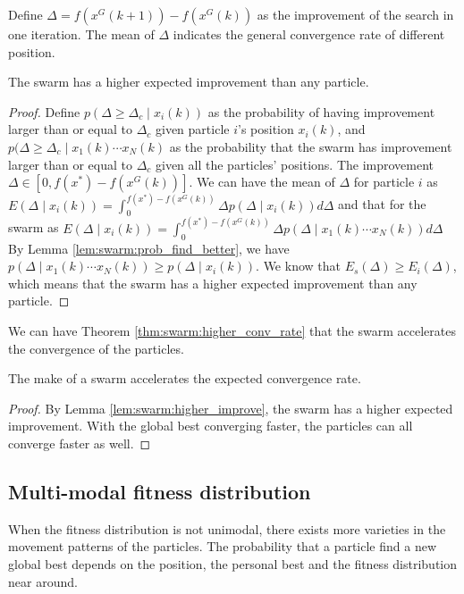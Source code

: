 Define $ \Delta = f(x^{G}(k+1)) - f(x^{G}(k)) $ as the improvement of the search in one iteration.
The mean of $ \Delta $ indicates the general convergence rate of different position.

\begin{mylem}
\label{lem:swarm:higher_improve}
The swarm has a higher expected improvement than any particle.
\begin{proof}
Define $ p( \Delta \geq \Delta_{c} \mid  x_{i}(k) ) $ as the probability of having improvement larger than or equal to $ \Delta_{c} $ given particle $ i $'s position $ x_{i}(k) $,
and $ p( \Delta \geq \Delta_{c} \mid x_{1}(k) \cdots x_{N}(k ) $ as the probability that the swarm has improvement larger than or equal to $ \Delta_{c} $ given all the particles' positions.
The improvement $ \Delta \in [0, f(x^{*}) - f(x^{G}(k))] $.
We can have the mean of $ \Delta $ for particle $ i $ as
$ E( \Delta \mid x_{i}(k) ) =  \int_{0}^{ f(x^{*}) - f(x^{G}(k)) } \Delta p( \Delta \mid  x_{i}(k) ) d \Delta $
and that for the swarm as 
$ E( \Delta \mid x_{i}(k) ) =  \int_{0}^{ f(x^{*}) - f(x^{G}(k)) } \Delta p( \Delta \mid  x_{1}(k) \cdots x_{N}(k) ) d \Delta $
By Lemma \ref{lem:swarm:prob_find_better}, we have $ p( \Delta \mid  x_{1}(k) \cdots x_{N}(k) ) \geq  p( \Delta \mid  x_{i}(k) ) $.
We know that $ E_{s} ( \Delta ) \geq E_{i} ( \Delta )  $, which means that the swarm has a higher expected improvement than any particle.
\end{proof}
\end{mylem}

We can have Theorem \ref{thm:swarm:higher_conv_rate} that the swarm accelerates the convergence of the particles.

\begin{mythm}
\label{thm:swarm:higher_conv_rate}
The make of a swarm accelerates the expected convergence rate.
\begin{proof}
By Lemma \ref{lem:swarm:higher_improve}, the swarm has a higher expected improvement.
With the global best converging faster, the particles can all converge faster as well.
\end{proof}
\end{mythm}

\subsection{Multi-modal fitness distribution}

When the fitness distribution is not unimodal, there exists more varieties in the movement patterns of the particles.
The probability that a particle find a new global best depends on the position, the personal best and the fitness distribution near around.

